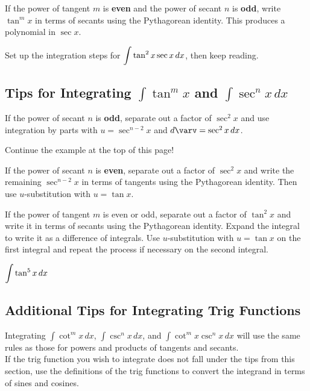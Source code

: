 \documentclass[12pt]{article}
\begin{document}
\newpage

If the power of tangent $m$ is \textbf{even} and the power of secant $n$ is \textbf{odd}, write $\tan^m x$ in terms of secants using the Pythagorean identity. This produces a polynomial in $\sec x$. 

\Example Set up the integration steps for $\displaystyle\int\tan^2x\sec x \,dx$, then keep reading.

\vspace{40mm}

\subsection*{Tips for Integrating $\int\tan^m x$ and $\int\sec^n x\,dx$}

If the power of secant $n$ is \textbf{odd}, separate out a factor of $\sec^2 x$ and use integration by parts with $u=\sec^{n-2}x$ and $d\varv=\sec^2x\,dx$.

\ExampleCont Continue the example at the top of this page!


\vfill

If the power of secant $n$ is \textbf{even}, separate out a factor of $\sec^2x$ and write the remaining $\sec^{n-2}x$ in terms of tangents using the Pythagorean identity. Then use $u$-substitution with $u=\tan x$. 

\newpage

If the power of tangent $m$ is even or odd, separate out a factor of $\tan^2x$ and write it in terms of secants using the Pythagorean identity. Expand the integral to write it as a difference of integrals. Use $u$-substitution with $u=\tan x$ on the first integral and repeat the process if necessary on the second integral.

\Example $\displaystyle\int\tan^5 x\,dx$

\vfill

\subsection*{Additional Tips for Integrating Trig Functions}

Integrating $\int\cot^m x\,dx$, $\int \csc^n x\,dx$, and $\int\cot^m x\csc^n x\,dx$ will use the same rules as those for powers and products of tangents and secants.\\

If the trig function you wish to integrate does not fall under the tips from this section, use the definitions of the trig functions to convert the integrand in terms of sines and cosines.
\end{document}
